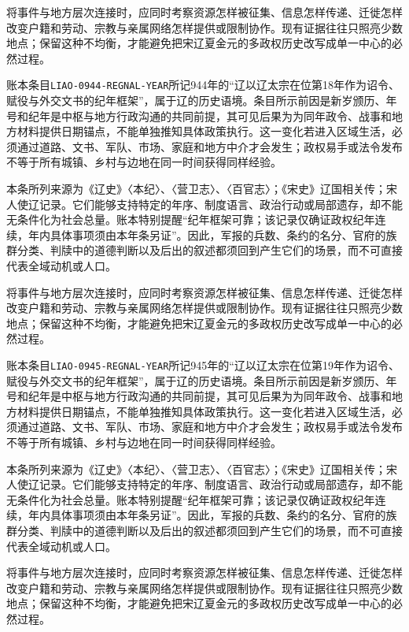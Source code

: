 将事件与地方层次连接时，应同时考察资源怎样被征集、信息怎样传递、迁徙怎样改变户籍和劳动、宗教与亲属网络怎样提供或限制协作。现有证据往往只照亮少数地点；保留这种不均衡，才能避免把宋辽夏金元的多政权历史改写成单一中心的必然过程。

账本条目\texttt{LIAO-0944-REGNAL-YEAR}所记944年的“辽以辽太宗在位第18年作为诏令、赋役与外交文书的纪年框架”，属于辽的历史语境。条目所示前因是新岁颁历、年号和纪年是中枢与地方行政沟通的共同前提，其可见后果为为同年政令、战事和地方材料提供日期锚点，不能单独推知具体政策执行。这一变化若进入区域生活，必须通过道路、文书、军队、市场、家庭和地方中介才会发生；政权易手或法令发布不等于所有城镇、乡村与边地在同一时间获得同样经验。

本条所列来源为《辽史》〈本纪〉、〈营卫志〉、〈百官志〉；《宋史》辽国相关传；宋人使辽记录。它们能够支持特定的年序、制度语言、政治行动或局部遗存，却不能无条件化为社会总量。账本特别提醒“纪年框架可靠；该记录仅确证政权纪年连续，年内具体事项须由本年条另证”。因此，军报的兵数、条约的名分、官府的族群分类、判牍中的道德判断以及后出的叙述都须回到产生它们的场景，而不可直接代表全域动机或人口。

将事件与地方层次连接时，应同时考察资源怎样被征集、信息怎样传递、迁徙怎样改变户籍和劳动、宗教与亲属网络怎样提供或限制协作。现有证据往往只照亮少数地点；保留这种不均衡，才能避免把宋辽夏金元的多政权历史改写成单一中心的必然过程。

账本条目\texttt{LIAO-0945-REGNAL-YEAR}所记945年的“辽以辽太宗在位第19年作为诏令、赋役与外交文书的纪年框架”，属于辽的历史语境。条目所示前因是新岁颁历、年号和纪年是中枢与地方行政沟通的共同前提，其可见后果为为同年政令、战事和地方材料提供日期锚点，不能单独推知具体政策执行。这一变化若进入区域生活，必须通过道路、文书、军队、市场、家庭和地方中介才会发生；政权易手或法令发布不等于所有城镇、乡村与边地在同一时间获得同样经验。

本条所列来源为《辽史》〈本纪〉、〈营卫志〉、〈百官志〉；《宋史》辽国相关传；宋人使辽记录。它们能够支持特定的年序、制度语言、政治行动或局部遗存，却不能无条件化为社会总量。账本特别提醒“纪年框架可靠；该记录仅确证政权纪年连续，年内具体事项须由本年条另证”。因此，军报的兵数、条约的名分、官府的族群分类、判牍中的道德判断以及后出的叙述都须回到产生它们的场景，而不可直接代表全域动机或人口。

将事件与地方层次连接时，应同时考察资源怎样被征集、信息怎样传递、迁徙怎样改变户籍和劳动、宗教与亲属网络怎样提供或限制协作。现有证据往往只照亮少数地点；保留这种不均衡，才能避免把宋辽夏金元的多政权历史改写成单一中心的必然过程。
